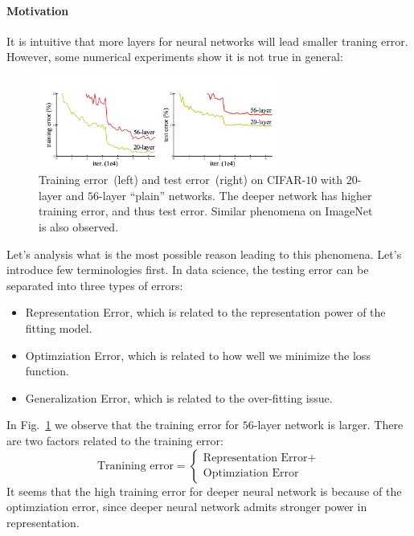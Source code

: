 \paragraph{Motivation}
It is intuitive that more layers for neural networks will lead smaller traning error. However, some numerical experiments show it is not true in general:
\begin{figure}[H]
\centering
\includegraphics[width=0.7\textwidth]{Forth_lecture/f_7}
\caption{
Training error~(left) and test error~(right) on CIFAR-$10$
with $20$-layer and $56$-layer ``plain'' networks. The deeper network
has higher training error, and thus test error. Similar phenomena
on ImageNet is also observed.
}
\label{fig:4:3}
\end{figure}
Let's analysis what is the most possible reason leading to this phenomena.
Let's introduce few terminologies first.
In data science, the testing error can be separated into three types of errors:
\begin{itemize}
\item
Representation Error, which is related to the representation power of the fitting model.
\item
Optimziation Error, which is related to how well we minimize the loss function.
\item
Generalization Error, which is related to the over-fitting issue.
\end{itemize}
In Fig.~\ref{fig:4:3} we observe that the training error for $56$-layer network is larger. There are two factors related to the training error:
\[
\mbox{Tranining error}=\left\{
\begin{aligned}
\mbox{Representation Error}+\\
\mbox{Optimziation Error}
\end{aligned}
\right.
\]
It seems that the high training error for deeper neural network is because of the optimziation error, since deeper neural network admits stronger power in representation.


